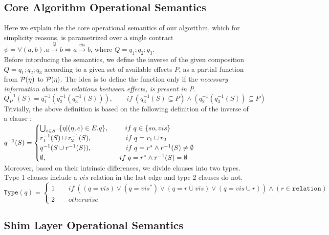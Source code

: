 \subsection{Core Algorithm Operational Semantics}
Here we explain the the core operational semantics of our algorithm, which for simplicity reasons, 
is parametrized over a single contract 
$\psi = \forall (a,b). a \xrightarrow{Q} b  \Rightarrow a \xrightarrow{vis} b$, where $Q=q_1;q_2;q_3$. 
\\Before intorducing the semantics, we define the inverse of the given composition $Q=q_1;q_2;q_3$ according to a given
set of available effects $P$, as a partial function from $\mathcal{P}(\eta)$ to
$\mathcal{P}(\eta)$. The idea is to define the function only if the \emph{necessary information about the relations beetween effects, is present in P}.
\\ $
Q^{-1}_P (S)= q_1^{-1} (q_2^{-1}(q_3^{-1}(S))), \qquad 
if \; (q_3^{-1}(S) \subseteq P)\wedge
(q_2^{-1}(q_3^{-1}(S))  \subseteq P)$
\\Trivially, the above definition is based on the following definition of
the inverse of a clause :\\
$q^{-1}(S) = 
\begin{cases}
\bigcup^{}_{e\in S}. \{\eta|(\eta,e) \in E.q \}, \hspace{8.5 mm} if \;
q\in\{so,vis\} \\ 
r_1^{-1}(S)\cup r_2^{-1}(S), \qquad \spc \qquad if \; q=r_1\cup r_2\\
q^{-1}(S\cup r^{-1}(S)), \qquad \quad \qquad if \; q=r^* \wedge r^{-1}(S) \neq \emptyset \\
\emptyset, \qquad \quad \hspace{20 mm} \qquad if \; q=r^* \wedge r^{-1}(S) = \emptyset
\end{cases}
$
\\ Moreover, based on their intrinsic differences, we divide clauses into two types. 
Type 1 clauses include a $vis$ relation in the last edge and type 2 clauses do not. 
\\$
\mathtt{Type}(q) = 
\begin{cases}
1 \qquad if \; ((q=vis) \vee (q=vis^*) \vee (q=r\cup vis) \vee (q=vis\cup r)) 
\wedge (r\in\mathtt{relation}) \\ 
2 \qquad otherwise
\end{cases}
$


\subsection {Shim Layer Operational Semantics}



